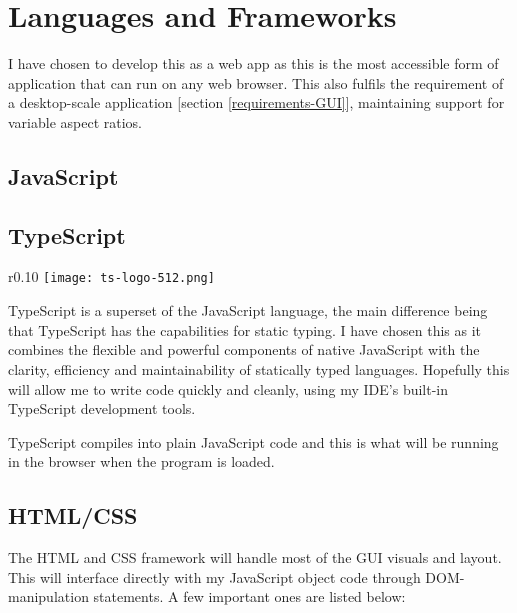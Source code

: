 \section{Languages and Frameworks}

    I have chosen to develop this as a web app as this is the most accessible form of application that can run on any web browser. This also fulfils the requirement of a desktop-scale application [section \ref{requirements-GUI}], maintaining support for variable aspect ratios.

    \subsection{JavaScript}



    \subsection{TypeScript}

        \begin{wrapfigure}{r}{0.10\textwidth}
            \centering
            \texttt{[image: ts-logo-512.png]}
        \end{wrapfigure}

        TypeScript \cite{typescript} is a superset of the JavaScript language, the main difference being that TypeScript has the capabilities for static typing. I have chosen this as it combines the flexible and powerful components of native JavaScript with the clarity, efficiency and maintainability of statically typed languages. Hopefully this will allow me to write code quickly and cleanly, using my IDE's built-in TypeScript development tools.

        TypeScript compiles into plain JavaScript code and this is what will be running in the browser when the program is loaded.

    \subsection{HTML/CSS}

        The HTML and CSS framework will handle most of the GUI visuals and layout. This will interface directly with my JavaScript object code through DOM-manipulation statements. A few important ones are listed below:

